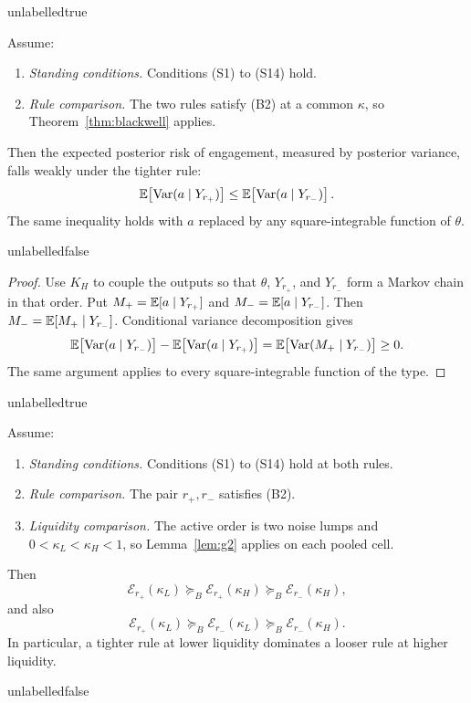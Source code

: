 \csname unlabelledtrue\endcsname
\begin{corollary}
\label{cor:blackwell-posterior}
Assume:
\begin{enumerate}[label=(P\arabic*),leftmargin=3.0em,itemsep=3pt]
\item \emph{Standing conditions.} Conditions (S1) to (S14) hold.
\item \emph{Rule comparison.} The two rules satisfy (B2) at a common $\kappa$, so
  Theorem~\ref{thm:blackwell} applies.
\end{enumerate}
Then the expected posterior risk of engagement, measured by posterior variance, falls weakly under
the tighter rule:
\begin{equation}
\label{eq:blackwell-posterior}
\mathbb{E}\!\left[\operatorname{Var}(a\mid Y_{r_+})\right]
\leq
\mathbb{E}\!\left[\operatorname{Var}(a\mid Y_{r_-})\right].
\end{equation}
The same inequality holds with $a$ replaced by any square-integrable function of $\theta$.
\end{corollary}
\csname unlabelledfalse\endcsname

\begin{proof}
Use $K_H$ to couple the outputs so that $\theta$, $Y_{r_+}$, and $Y_{r_-}$ form a Markov chain in
that order. Put $M_+=\mathbb{E}[a\mid Y_{r_+}]$ and $M_-=\mathbb{E}[a\mid Y_{r_-}]$. Then
$M_-=\mathbb{E}[M_+\mid Y_{r_-}]$. Conditional variance decomposition gives
\[
\mathbb{E}\!\left[\operatorname{Var}(a\mid Y_{r_-})\right]
-\mathbb{E}\!\left[\operatorname{Var}(a\mid Y_{r_+})\right]
=\mathbb{E}\!\left[\operatorname{Var}(M_+\mid Y_{r_-})\right]\geq0.
\]
The same argument applies to every square-integrable function of the type.
\end{proof}

\csname unlabelledtrue\endcsname
\begin{corollary}
\label{cor:blackwell-chain}
Assume:
\begin{enumerate}[label=(K\arabic*),leftmargin=3.0em,itemsep=3pt]
\item \emph{Standing conditions.} Conditions (S1) to (S14) hold at both rules.
\item \emph{Rule comparison.} The pair $r_+,r_-$ satisfies (B2).
\item \emph{Liquidity comparison.} The active order is two noise lumps and
  $0<\kappa_L<\kappa_H<1$, so Lemma~\ref{lem:g2} applies on each pooled cell.
\end{enumerate}
Then
\begin{equation}
\label{eq:blackwell-chain}
\mathcal E_{r_+}(\kappa_L)
\succeq_B\mathcal E_{r_+}(\kappa_H)
\succeq_B\mathcal E_{r_-}(\kappa_H),
\end{equation}
and also
\[
\mathcal E_{r_+}(\kappa_L)
\succeq_B\mathcal E_{r_-}(\kappa_L)
\succeq_B\mathcal E_{r_-}(\kappa_H).
\]
In particular, a tighter rule at lower liquidity dominates a looser rule at higher liquidity.
\end{corollary}
\csname unlabelledfalse\endcsname

